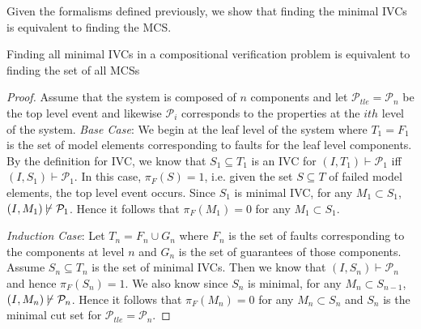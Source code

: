 Given the formalisms defined previously, we show that finding the minimal IVCs is equivalent to finding the MCS. \\

\begin{theorem} Finding all minimal IVCs in a compositional verification problem is equivalent to finding the set of all MCSs \\

\begin{proof} 
Assume that the system is composed of $n$ components and let $\mathcal{P}_{tle} = \mathcal{P}_n$ be the top level event and likewise $\mathcal{P}_{i}$ corresponds to the properties at the $i{th}$ level of the system. 
\textit{Base Case}:
We begin at the leaf level of the system where $T_1 = F_1$ is the set of model elements corresponding to faults for the leaf level components. By the definition for IVC, we know that $S_1 \subseteq T_1$ is an IVC for $(I, T_1) \vdash \mathcal{P}_{1}$ iff $(I, S_1) \vdash \mathcal{P}_{1}$.
In this case, $\pi_F(S) = 1$, i.e. given the set $S \subseteq T$ of failed model elements, the top level event occurs. 
Since $S_1$ is minimal IVC, for any $M_1 \subset S_1$, $(I, M_1) \mkern-2mu\not\mkern2mu\vdash \mathcal{P}_{1}$. Hence it follows that $\pi_F(M_1) = 0$ for any $M_1 \subset S_1$.

\textit{Induction Case}:
Let $T_{n} = F_{n} \cup G_{n}$ where $F_{n}$ is the set of faults corresponding to the components at level ${n}$ and $G_{n}$ is the set of guarantees of those components. Assume $S_{n} \subseteq T_{n}$ is the set of minimal IVCs. Then we know that $(I, S_{n}) \vdash \mathcal{P}_{n}$ and hence $\pi_F(S_{n}) = 1$. We also know since $S_{n}$ is minimal, for any $M_{n} \subset S_{n-1}$, $(I, M_{n}) \mkern-2mu\not\mkern2mu\vdash \mathcal{P}_{n}$. Hence it follows that $\pi_F(M_{n}) = 0$ for any $M_{n} \subset S_{n}$ and $S_{n}$ is the minimal cut set for $\mathcal{P}_{tle} = \mathcal{P}_n$.

\end{proof}
\end{theorem}

 



